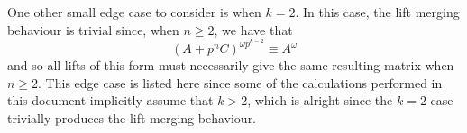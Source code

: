 \documentclass[a4paper, 12pt, reqno]{amsart}
\begin{document}
		One other small edge case to consider is when $k=2$. In this case, the lift merging behaviour is trivial since, when $n\geq2$, we have that
		\[
			(A+p^nC)^{\omega p^{k-2}} \equiv A^\omega
		\]
		and so all lifts of this form must necessarily give the same resulting matrix when $n \geq 2$. This edge case is listed here since some of the calculations performed
		in this document implicitly assume that $k > 2$, which is alright since the $k=2$ case trivially produces the lift merging behaviour.
		
		\begin{comment}
			\vspace*{-5cm}
			\begin{center}
				\begin{tabular}{c}
					\vspace{6.4cm} \\
					1 \\
					  \\
					2 \\
					  \\
					3 \\
					  \\
					4 \\
					  \\
					5
				\end{tabular}
				\hspace*{0.5cm}
				\Tree
				[.$p^{k-2}$
					[.$\newmoon$ [.$\newmoon$ [.$\newmoon$ [.$\newmoon$ [.$\newmoon$ ]]]]] 
					[.$\newmoon$ [.$\newmoon$ [.$\newmoon$ [.$\newmoon$ [.$\newmoon$ ]]]]]
				]
			\end{center}
		\end{comment}
\end{document}
